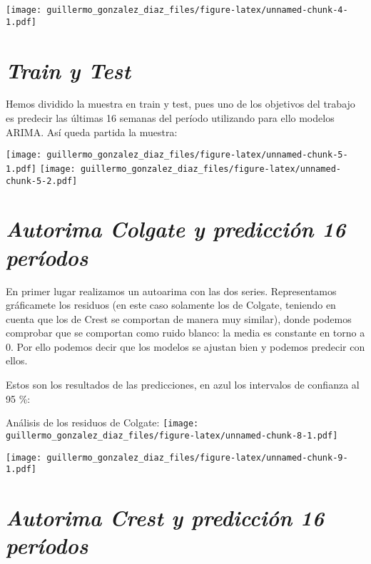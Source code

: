 \documentclass[
]{article}
\begin{document}
\texttt{[image: guillermo\_gonzalez\_diaz\_files/figure-latex/unnamed-chunk-4-1.pdf]}

\hypertarget{train-y-test}{%
\section{\texorpdfstring{\emph{Train y
Test}}{Train y Test}}\label{train-y-test}}

Hemos dividido la muestra en train y test, pues uno de los objetivos del
trabajo es predecir las últimas 16 semanas del período utilizando para
ello modelos ARIMA. Así queda partida la muestra:

\texttt{[image: guillermo\_gonzalez\_diaz\_files/figure-latex/unnamed-chunk-5-1.pdf]}
\texttt{[image: guillermo\_gonzalez\_diaz\_files/figure-latex/unnamed-chunk-5-2.pdf]}

\hypertarget{autorima-colgate-y-predicciuxf3n-16-peruxedodos}{%
\section{\texorpdfstring{\emph{Autorima Colgate y predicción 16
períodos}}{Autorima Colgate y predicción 16 períodos}}\label{autorima-colgate-y-predicciuxf3n-16-peruxedodos}}

En primer lugar realizamos un autoarima con las dos series.
Representamos gráficamete los residuos (en este caso solamente los de
Colgate, teniendo en cuenta que los de Crest se comportan de manera muy
similar), donde podemos comprobar que se comportan como ruido blanco: la
media es constante en torno a 0. Por ello podemos decir que los modelos
se ajustan bien y podemos predecir con ellos.

Estos son los resultados de las predicciones, en azul los intervalos de
confianza al 95 \%:

Análisis de los residuos de Colgate:
\texttt{[image: guillermo\_gonzalez\_diaz\_files/figure-latex/unnamed-chunk-8-1.pdf]}

\texttt{[image: guillermo\_gonzalez\_diaz\_files/figure-latex/unnamed-chunk-9-1.pdf]}

\hypertarget{autorima-crest-y-predicciuxf3n-16-peruxedodos}{%
\section{\texorpdfstring{\emph{Autorima Crest y predicción 16
períodos}}{Autorima Crest y predicción 16 períodos}}\label{autorima-crest-y-predicciuxf3n-16-peruxedodos}}
\end{document}
